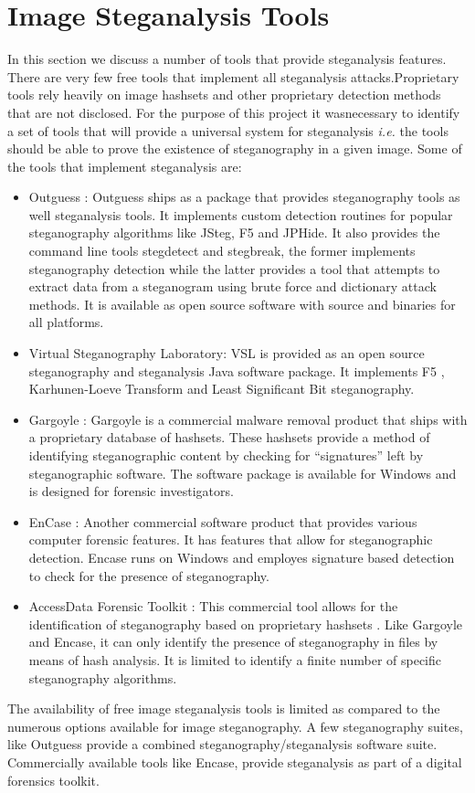 \section{Image Steganalysis Tools}
\label{sec:steganalysistools}
In this section we discuss a number of tools that provide steganalysis features. There are very few free tools that implement all steganalysis attacks.Proprietary tools rely heavily on image hashsets and other proprietary detection methods that are not disclosed. For the purpose of this project it wasnecessary to identify a set of tools that will provide a universal system for steganalysis \emph{i.e.} the tools should be able to prove the existence of steganography in a given image. Some of the tools that implement steganalysis are:
\begin{itemize}
\item Outguess : Outguess \cite{outguess} ships as a package that provides steganography tools as well steganalysis tools. It implements custom detection routines for popular steganography algorithms like JSteg, F5 and JPHide. It also provides the command line tools stegdetect and stegbreak, the former implements steganography detection while the latter provides a tool that attempts to extract data from a steganogram using brute force and dictionary attack methods. It is available as open source software with source and binaries for all platforms. 
\item Virtual Steganography Laboratory: VSL \cite{wegrzyn2009} is provided as an open source steganography and steganalysis Java software package. It implements F5 \cite{westfeld2001f5}, Karhunen-Loeve Transform \cite{stanescu2007digital} and Least Significant Bit steganography.
\item Gargoyle : Gargoyle \cite{gargoyle} is a commercial malware removal product that ships with a proprietary database of hashsets. These hashsets provide a method of identifying steganographic content by checking for ``signatures'' left by steganographic software. The software package is available for Windows and is designed for forensic investigators.
\item EnCase : Another commercial software product \cite{encase} that provides various  computer forensic features. It has features that allow for steganographic detection. Encase runs on Windows and employes signature based detection to check for the presence of steganography.
\item AccessData Forensic Toolkit :  This commercial tool allows for the identification of steganography based on proprietary hashsets \cite{ftk}. Like Gargoyle and Encase, it can only identify the presence of steganography in files by means of hash analysis. It is limited to identify a finite number of specific steganography algorithms. 
 
\end{itemize}
The availability of free image steganalysis tools is limited as compared to the numerous options available for image steganography. A few steganography suites, like Outguess \cite{outguess} provide a combined steganography/steganalysis software suite. Commercially available tools like Encase, provide steganalysis as part of a digital forensics toolkit.  

